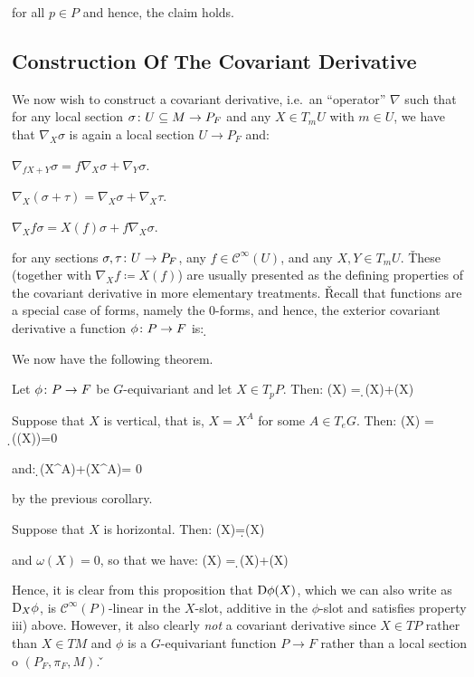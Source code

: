 for all $p\in P$ and hence, the claim holds.
\eq

\subsection{Construction Of The Covariant Derivative}

We now wish to construct a covariant derivative, i.e.\ an ``operator'' $\nabla$ such that for any local section
$\sigma \colon U \subseteq M \to P_F$ and any $X\in T_m U$ with $m\in U$, we have that $\nabla_X \sigma$ is again a
local section $U\to P_F$ and:
\ben[label=\roman*)]
\item $\nabla_{fX+Y}\sigma = f\nabla_{X}\sigma+\nabla_{Y}\sigma$.
\item $\nabla_X(\sigma+\tau) = \nabla_X\sigma+\nabla_X\tau$.
\item $\nabla_X f\sigma = X(f)\sigma+f\nabla_X\sigma$.
\een

for any sections $\sigma,\tau\colon U\to P_F$, any $f\in \mathcal{C}^{\infty} (U)$, and any $X,Y\in T_m U$. \v

These (together with $\nabla_X f \coloneqq X(f)$) are usually presented as the defining properties of the covariant
derivative in more elementary treatments. \v

Recall that functions are a special case of forms, namely the $0$-forms, and hence, the exterior covariant derivative
a function $\phi\colon P\to F$ is:
\bse
\D\phi \coloneqq \d \phi \circ \hor
\ese

We now have the following theorem.

\bt[]
Let $\phi\colon P\to F$ be $G$-equivariant and let $X\in T_p P$. Then:
\bse
\D\phi(X) = \d\phi(X)+\omega(X)\lacts \phi
\ese
\et

\bq
\ben[label=(\alph*)]
\item Suppose that $X$ is vertical, that is, $X=X^A$ for some $A\in T_e G$. Then:
\bse
\D\phi(X) = \d\phi(\hor(X))=0
\ese

and:
\bse
\d\phi(X^A)+\omega(X^A)\lacts \phi = 0
\ese

by the previous corollary.
\item Suppose that $X$ is horizontal. Then:
\bse
\D\phi(X)=\d\phi(X)
\ese

and $\omega(X)=0$, so that we have:
\bse
\D\phi(X) = \d\phi(X)+\omega(X)\lacts \phi\qedhere
\ese
\een
\eq

Hence, it is clear from this proposition that $\mathrm{D}\phi(X)$, which we can also write as $\mathrm{D}_X\phi$, is
$\mathcal{C}^{\infty}(P)$-linear in the $X$-slot, additive in the $\phi$-slot and satisfies property iii) above.
However, it also clearly \emph{not} a covariant derivative since $X\in TP$ rather than $X\in TM$ and $\phi$ is a
$G$-equivariant function $P\to F$ rather than a local section o $(P_F,\pi_F, M)$. \v

